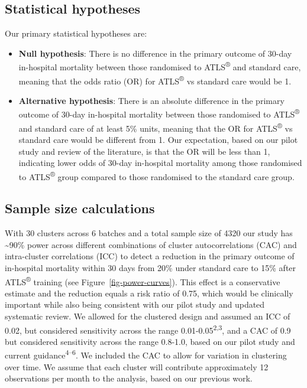\documentclass[
]{scrartcl}
\providecommand{\tightlist}{%
  \setlength{\itemsep}{0pt}\setlength{\parskip}{0pt}}\usepackage{longtable,booktabs,array}
\begin{document}
\hypertarget{statistical-hypotheses}{%
\subsection{Statistical hypotheses}\label{statistical-hypotheses}}

Our primary statistical hypotheses are:

\begin{itemize}
\tightlist
\item
  \textbf{Null hypothesis}: There is no difference in the primary
  outcome of 30-day in-hospital mortality between those randomised to
  ATLS\textsuperscript{®} and standard care, meaning that the odds ratio
  (OR) for ATLS\textsuperscript{®} vs standard care would be 1.
\item
  \textbf{Alternative hypothesis}: There is an absolute difference in
  the primary outcome of 30-day in-hospital mortality between those
  randomised to ATLS\textsuperscript{®} and standard care of at least
  5\% units, meaning that the OR for ATLS\textsuperscript{®} vs standard
  care would be different from 1. Our expectation, based on our pilot
  study and review of the literature, is that the OR will be less than
  1, indicating lower odds of 30-day in-hospital mortality among those
  randomised to ATLS\textsuperscript{®} group compared to those
  randomised to the standard care group.
\end{itemize}

\hypertarget{sample-size-calculations}{%
\subsection{Sample size calculations}\label{sample-size-calculations}}

With 30 clusters across 6 batches and a total sample size of 4320 our
study has \textasciitilde90\% power across different combinations of
cluster autocorrelations (CAC) and intra-cluster correlations (ICC) to
detect a reduction in the primary outcome of in-hospital mortality
within 30 days from 20\% under standard care to 15\% after
ATLS\textsuperscript{®} training (see Figure~\ref{fig-power-curves}).
This effect is a conservative estimate and the reduction equals a risk
ratio of 0.75, which would be clinically important while also being
consistent with our pilot study and updated systematic review. We
allowed for the clustered design and assumed an ICC of 0.02, but
considered sensitivity across the range 0.01-0.05\textsuperscript{2,3},
and a CAC of 0.9 but considered sensitivity across the range 0.8-1.0,
based on our pilot study and current guidance\textsuperscript{4--6}. We
included the CAC to allow for variation in clustering over time. We
assume that each cluster will contribute approximately 12 observations
per month to the analysis, based on our previous work.
\end{document}
